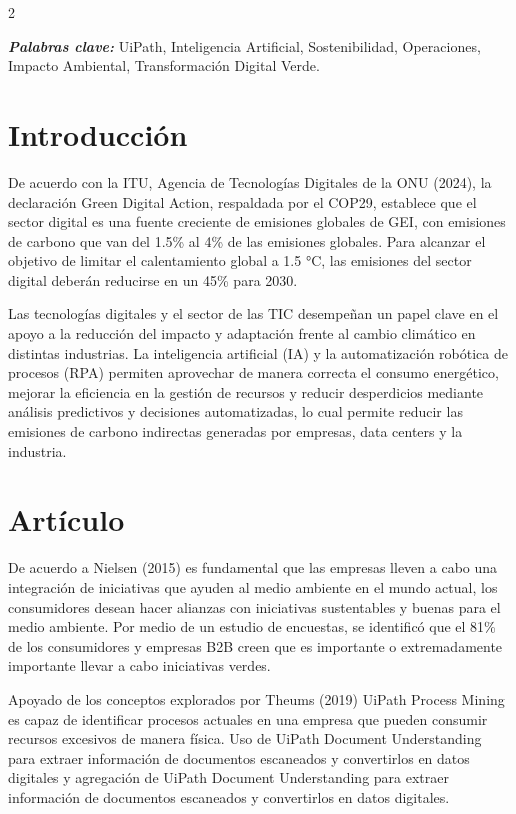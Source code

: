\documentclass[12pt,spanish,Letterpaper,openany]{book}
\begin{document}
\begin {multicols}{2}

\textbf{\emph{Palabras clave:}} UiPath, Inteligencia Artificial, Sostenibilidad, Operaciones, Impacto Ambiental, Transformación Digital Verde.

\hypertarget{introducciuxf3n-6}{%
\section{Introducción}\label{introducciuxf3n-6}}

De acuerdo con la ITU, Agencia de Tecnologías Digitales de la ONU (2024), la declaración
Green Digital Action, respaldada por el COP29, establece que el sector digital es una fuente
creciente de emisiones globales de GEI, con emisiones de carbono que van del 1.5\% al 4\% de las
emisiones globales. Para alcanzar el objetivo de limitar el calentamiento global a 1.5 °C, las
emisiones del sector digital deberán reducirse en un 45\% para 2030.

Las tecnologías digitales y el sector de las TIC desempeñan un papel clave en el apoyo a la
reducción del impacto y adaptación frente al cambio climático en distintas industrias. La
inteligencia artificial (IA) y la automatización robótica de procesos (RPA) permiten aprovechar
de manera correcta el consumo energético, mejorar la eficiencia en la gestión de recursos y
reducir desperdicios mediante análisis predictivos y decisiones automatizadas, lo cual permite
reducir las emisiones de carbono indirectas generadas por empresas, data centers y la industria.

\hypertarget{artuxedculo-6}{%
\section{Artículo}\label{artuxedculo-6}}

De acuerdo a Nielsen (2015) es fundamental que las empresas lleven a cabo una integración de
iniciativas que ayuden al medio ambiente en el mundo actual, los consumidores desean hacer
alianzas con iniciativas sustentables y buenas para el medio ambiente. Por medio de un estudio
de encuestas, se identificó que el 81\% de los consumidores y empresas B2B creen que es
importante o extremadamente importante llevar a cabo iniciativas verdes.

Apoyado de los conceptos explorados por Theums (2019) UiPath Process Mining es capaz de identificar procesos actuales en una empresa que pueden consumir recursos excesivos de manera física. Uso de UiPath Document Understanding para extraer información de documentos escaneados y convertirlos en datos digitales y agregación de UiPath Document Understanding para extraer información de documentos escaneados y convertirlos en datos digitales.


\end{multicols}
\end{document}
